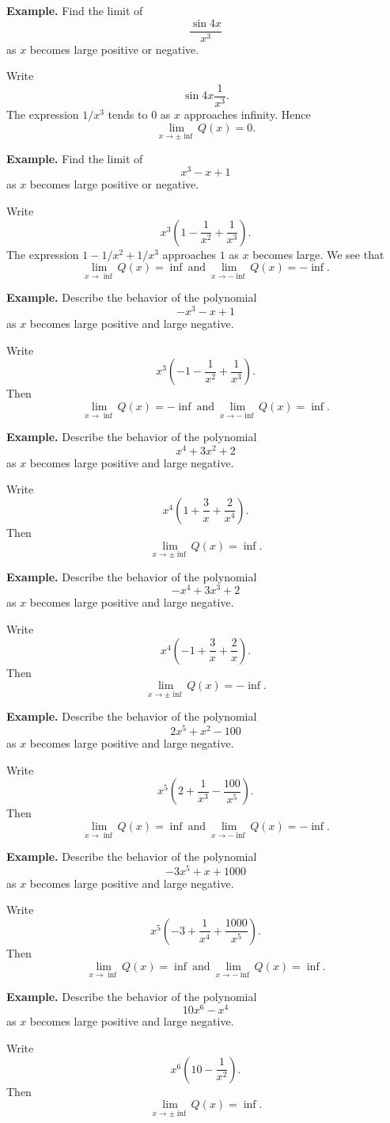 \textbf{Example.} Find the limit of
\[\frac{\sin 4x}{x^3}\]
as $x$ becomes large positive or negative.

Write
\[\sin 4x \frac{1}{x^3}.\]
The expression $1/x^3$ tends to $0$ as $x$ approaches infinity. Hence
\[\lim_{x\to\pm\inf} Q(x) = 0.\]

\textbf{Example.} Find the limit of
\[x^3 - x + 1\]
as $x$ becomes large positive or negative.

Write
\[x^3(1 - \frac{1}{x^2} + \frac{1}{x^3}).\]
The expression $1 - 1/x^2 + 1/x^3$ approaches $1$ as $x$ becomes large. We see that
\[\lim_{x\to\inf} Q(x) = \inf\: \text{and}\: \lim_{x\to-\inf} Q(x) = -\inf.\]

\textbf{Example.} Describe the behavior of the polynomial
\[-x^3 - x + 1\]
as $x$ becomes large positive and large negative.

Write
\[x^3(-1 - \frac{1}{x^2} + \frac{1}{x^3}).\]
Then
\[\lim_{x\to\inf} Q(x) = -\inf\: \text{and}\: \lim_{x\to-\inf} Q(x) = \inf.\]

\textbf{Example.} Describe the behavior of the polynomial
\[x^4 + 3x^2 + 2\]
as $x$ becomes large positive and large negative.

Write
\[x^4(1 + \frac{3}{x} + \frac{2}{x^4}).\]
Then
\[\lim_{x\to\pm\inf} Q(x) = \inf.\]

\textbf{Example.} Describe the behavior of the polynomial
\[-x^4 + 3x^3 + 2\]
as $x$ becomes large positive and large negative.

Write
\[x^4(-1 + \frac{3}{x} + \frac{2}{x}).\]
Then
\[\lim_{x\to\pm\inf} Q(x) = -\inf.\]

\textbf{Example.} Describe the behavior of the polynomial
\[2x^5 + x^2 - 100\]
as $x$ becomes large positive and large negative.

Write
\[x^5(2 + \frac{1}{x^3} - \frac{100}{x^5}).\]
Then
\[\lim_{x\to\inf} Q(x) = \inf\: \text{and}\: \lim_{x\to-\inf} Q(x) = -\inf.\]

\textbf{Example.} Describe the behavior of the polynomial
\[-3x^5 + x + 1000\]
as $x$ becomes large positive and large negative.

Write
\[x^5(-3 + \frac{1}{x^4} + \frac{1000}{x^5}).\]
Then
\[\lim_{x\to\inf} Q(x) = \inf\: \text{and}\: \lim_{x\to-\inf} Q(x) = \inf.\]

\textbf{Example.} Describe the behavior of the polynomial
\[10x^6 - x^4\]
as $x$ becomes large positive and large negative.

Write
\[x^6(10 - \frac{1}{x^2}).\]
Then
\[\lim_{x\to\pm\inf} Q(x) = \inf.\]


